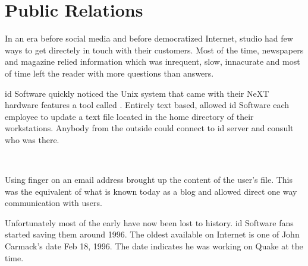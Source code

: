 \section{Public Relations}
In an era before social media and before democratized Internet, studio had few ways to get directely in touch with their customers. Most of the time, newspapers and magazine relied information which was inrequent, slow, innacurate and most of time left the reader with more questions than answers.\\
\par
id Software quickly noticed the Unix system that came with their NeXT hardware features a tool called . Entirely text based,  allowed id Software each employee to update a  text file located in the home directory of their workstations. Anybody from the outside could connect to id server and consult who was there.\\
\par
{}
\par
{}\\
\par

Using finger on an email address brought up the content of the user's  file. This was the equivalent of what is known today as a blog and allowed direct one way communication with users.\\
\par
Unfortunately most of the early  have now been lost to history. id Software fans started saving them around 1996. The oldest available on Internet is one of John Carmack's date Feb 18, 1996. The date indicates he was working on Quake at the time.\\
\par
{}


